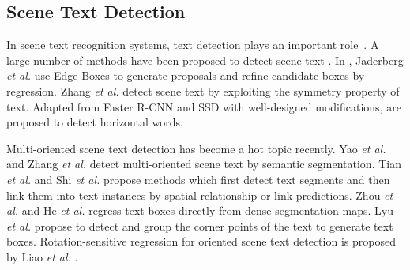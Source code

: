 \documentclass[runningheads]{llncs}
\begin{document}
\subsection{Scene Text Detection}
In scene text recognition systems, text detection plays an important role~\cite{zhu2016scene}. A large number of methods have been proposed to detect scene text \cite{epshtein2010detecting,neumann2010method,neumann2012real,yao2012detecting,huang2014robust,kang2014orientation,zhang2015symmetry,jaderberg2016reading,tian2015text,zhang2015symmetry,zhong2016deeptext,liao2017textboxes,yao2016scene,zhang2016multi,liu2017deep,he2017single,tian2016detecting,shi2017detecting,zhou2017east,he2017deep,lyu2018multi,liao2018rotation}. 
In \cite{jaderberg2016reading}, Jaderberg \emph{et al.} use Edge Boxes \cite{zitnick2014edge} to generate proposals and refine candidate boxes by regression. 
Zhang \emph{et al.} \cite{zhang2015symmetry} detect scene text by exploiting the symmetry property of text. 
Adapted from Faster R-CNN \cite{ren2015faster} and SSD \cite{liu2016ssd} with well-designed modifications, \cite{zhong2016deeptext,liao2017textboxes} are proposed to detect horizontal words.

Multi-oriented scene text detection has become a hot topic recently. Yao \emph{et al.} \cite{yao2016scene} and Zhang \emph{et al.} \cite{zhang2016multi} detect multi-oriented scene text by semantic segmentation. 
Tian \emph{et al.} \cite{tian2016detecting} and Shi \emph{et al.} \cite{shi2017detecting} propose methods which first detect text segments and then link  them into text instances by spatial relationship or link predictions.
Zhou \emph{et al.} \cite{zhou2017east} and He \emph{et al.} \cite{he2017deep} regress text boxes directly from dense segmentation maps. 
Lyu \emph{et al.} \cite{lyu2018multi} propose to detect and group the corner points of the text to generate text boxes. Rotation-sensitive regression for oriented scene text detection is proposed by Liao \emph{et al.} \cite{liao2018rotation}.
\end{document}
